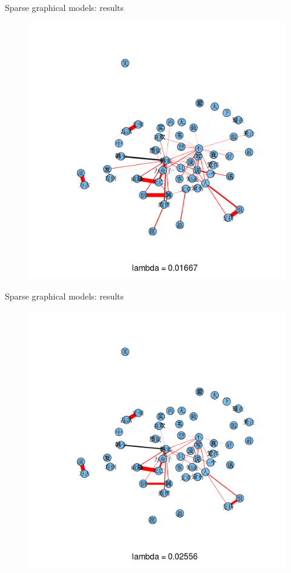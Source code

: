 \documentclass[12pt, trans]{beamer}
\newcommand{\1}[1]{{\mathbf 1}\left\{#1\right\}}        %
\begin{document}
\begin{frame}{Sparse graphical models: results}

\begin{figure}
  \centering
  \includegraphics[height=0.9\textheight]{./../../gLassoResults/glasso4.png} 
\end{figure}

\end{frame}
\begin{frame}{Sparse graphical models: results}

\begin{figure}
  \centering
  \includegraphics[height=0.9\textheight]{./../../gLassoResults/glasso5.png} 
\end{figure}

\end{frame}
\end{document}
